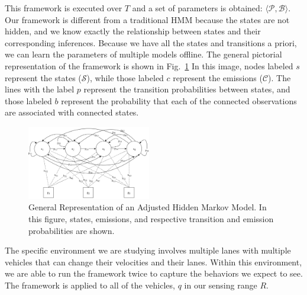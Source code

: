 \documentclass[letterpaper, 10 pt, conference]{ieeeconf}  %
\newcommand\NB[1]{$\spadesuit$\footnote{NB: #1}}
\begin{document}
This framework is executed over $T$ and a set of parameters is obtained: $\langle \mathcal{P}, \mathcal{B} \rangle$. Our framework is different from a traditional HMM because the states are not hidden, and we know exactly the relationship %
between states and their corresponding inferences. Because we have all the states and transitions a priori, we can learn the parameters of multiple models offline. %
The general pictorial representation of the framework is shown in Fig.~\ref{fig:hmm} %
In this image, nodes labeled $s$ represent the states ($\mathcal{S}$), while those labeled $c$ represent the emissions ($\mathcal{C}$). The lines with the label $p$ represent the transition probabilities between states, and those labeled $b$ represent the probability that each of the connected observations are associated with connected states.

\begin{figure}[ht!]
    \includegraphics[width=0.48\textwidth]{fig/ahmm.png}
    \caption{General Representation of an Adjusted Hidden Markov Model. In this figure, states, emissions, and respective transition and emission probabilities are shown.}
    \label{fig:hmm}
\end{figure}

The specific environment we are studying involves multiple lanes with multiple vehicles that can change their velocities and their lanes. Within this environment, we are able to run the framework twice to capture the behaviors we expect to see. The framework is applied to all of the vehicles, $q$ in our sensing range $R$.
\end{document}
